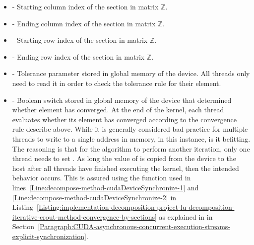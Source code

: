 \begin{itemize}
	\item {} - Starting column index of the section in matrix $ \mathbb{Z} $.
	\item {} - Ending column index of the section in matrix $ \mathbb{Z} $.
	\item {} - Starting row index of the section in matrix $ \mathbb{Z} $.
	\item {} - Ending row index of the section in matrix $ \mathbb{Z} $.
	\item {} - Tolerance parameter stored in global memory of the device. All threads only need to read it in order to check the tolerance rule for their element.
	\item {} - Boolean switch stored in global memory of the device that determined whether element  has converged. At the end of the kernel, each thread evaluates whether its element has converged according to the convergence rule describe above. While it is generally considered bad practice for multiple threads to write to a single address in memory, in this instance, is it befitting. The reasoning is that for the algorithm to perform another iteration, only one thread needs to set . As long the value of  is copied from the device to the host after all threads have finished executing the kernel, then the intended behavior occurs. This is assured using the  function used in lines~\ref{Line:decompose-method-cudaDeviceSynchronize-1} and \ref{Line:decompose-method-cudaDeviceSynchronize-2} in Listing~\ref{Listing:implementation-decomposition-project-lu-decomposition-iterative-crout-method-convergence-by-sections} as explained in \textit{} in Section~\ref{Paragraph:CUDA-asynchronous-concurrent-execution-streams-explicit-synchronization}.
\end{itemize}

